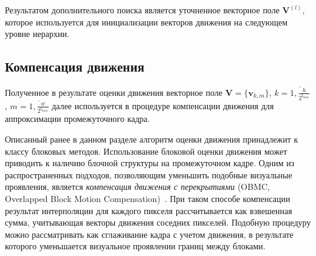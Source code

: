 Результатом дополнительного поиска является уточненное векторное поле $\mathbf{V}^{(l)}$, которое используется для инициализации векторов движения на следующем уровне иерархии.

\subsection{Компенсация движения}

Полученное в результате оценки движения векторное поле $\mathbf{V}=\{\mathbf{v}_{k,m}\}$, $k=\overline{1,\frac{h}{2^{l_{max}}}}$, $m=\overline{1,\frac{w}{2^{l_{max}}}}$ далее используется в процедуре компенсации движения для аппроксимации промежуточного кадра.

Описанный ранее в данном разделе алгоритм оценки движения принадлежит к классу блоковых методов. Использование блоковой оценки движения может приводить к наличию блочной структуры на промежуточном кадре. Одним из распространенных подходов, позволяющим уменьшить подобные визуальные проявления, является \emph{компенсация движения с перекрытиями} (OBMC, Overlapped Block Motion Compensation)~\cite{Orchard1994}. При таком способе компенсации результат интерполяции для каждого пикселя рассчитывается как взвешенная сумма, учитывающая векторы движения соседних пикселей. Подобную процедуру можно рассматривать как сглаживание кадра с учетом движения, в результате которого уменьшается визуальное проявлении границ между блоками.

